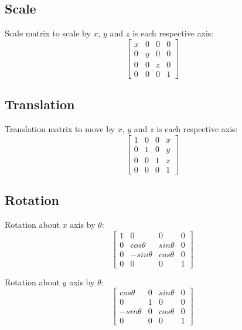 \documentclass[a4paper]{article}
\begin{document}
\subsection{Scale}

Scale matrix to scale by $x$, $y$ and $z$ is each respective axis:
\[
  \left [
    \begin{array}{cccc}
      x & 0 & 0 & 0 \\
      0 & y & 0 & 0 \\
      0 & 0 & z & 0 \\
      0 & 0 & 0 & 1
    \end{array}
  \right ]
\]

\subsection{Translation}

Translation matrix to move by $x$, $y$ and $z$ is each respective axis:
\[
  \left [
    \begin{array}{cccc}
      1 & 0 & 0 & x \\
      0 & 1 & 0 & y \\
      0 & 0 & 1 & z \\
      0 & 0 & 0 & 1
    \end{array}
  \right ]
\]

\subsection{Rotation}

Rotation about $x$ axis by $\theta$:
\[
  \left [
    \begin{array}{cccc}
      1 & 0           & 0         & 0 \\
      0 & cos\theta   & sin\theta & 0 \\
      0 & -sin\theta  & cos\theta & 0 \\
      0 & 0           & 0         & 1
    \end{array}
  \right ]
\]

Rotation about $y$ axis by $\theta$:
\[
  \left [
    \begin{array}{cccc}
      cos\theta   & 0 & sin\theta & 0 \\
      0           & 1 & 0         & 0 \\
      -sin\theta  & 0 & cos\theta & 0 \\
      0           & 0 & 0         & 1
    \end{array}
  \right ]
\]
\end{document}
